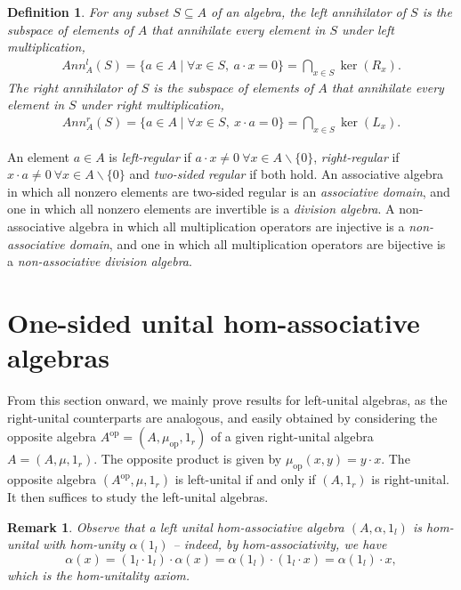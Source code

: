 \documentclass[12pt]{article}
\newtheorem{definition}[theorem]{Definition}
\newtheorem{remark}[theorem]{Remark}
\begin{document}
		\begin{definition}
			For any subset $S\subseteq A$ of an algebra, the left annihilator of $S$ is the subspace of elements of $A$ that annihilate every element in $S$ under left multiplication,
			\begin{align}
				Ann_A^l(S)=\{a\in A\mid \forall x\in S,\ a\cdot x=0\}
				=\bigcap\limits_{x\in S}\ker(R_x).
			\end{align}
			The right annihilator of $S$ is the subspace of elements of $A$ that annihilate every element in $S$ under right multiplication,
			\begin{align}
				Ann_A^r(S)=\{a\in A\mid \forall x\in S,\ x\cdot a=0\}=\bigcap\limits_{x\in S}\ker(L_x).
			\end{align}
		\end{definition}
		An element $a\in A$ is \textit{left-regular} if $a\cdot x\neq 0 \ \forall x\in A\backslash\{0\}$, \textit{right-regular} if $x\cdot a\neq 0 \ \forall x\in A\backslash\{0\}$ and \textit{two-sided regular} if both hold. An associative algebra in which all nonzero elements are two-sided regular is an \textit{associative domain}, and one in which all nonzero elements are invertible is a \textit{division algebra}. A non-associative algebra in which all multiplication operators are injective is a \textit{non-associative domain}, and one in which all multiplication operators are bijective is a \textit{non-associative division algebra}.
		
		\section{One-sided unital hom-associative algebras}\label{sec:unital-1SU}
		From this section onward, we mainly prove results for left-unital algebras, as the right-unital counterparts are analogous, and easily obtained by considering the opposite algebra $A^{\mathrm{op}}=(A,\mu_{\mathrm{op}},1_r)$ of a given right-unital algebra $A=(A,\mu,1_r)$. The opposite product is given by $\mu_{\mathrm{op}}(x,y)=y\cdot x$. The opposite algebra $(A^{\mathrm{op}},\mu,1_r)$ is left-unital if and only if $(A,1_r)$ is right-unital. It then suffices to study the left-unital algebras.
		
		\begin{remark}
			Observe that a left unital hom-associative algebra $(A,\alpha,1_l)$ is hom-unital with hom-unity  $\alpha(1_l)$ -- indeed, by hom-associativity, we have
			\begin{equation*}
				\alpha(x)=(1_l\cdot 1_l)\cdot\alpha(x)=\alpha(1_l)\cdot(1_l\cdot x)=\alpha(1_l)\cdot x,
			\end{equation*}
			which is the hom-unitality axiom.
		\end{remark}
		
\end{document}
